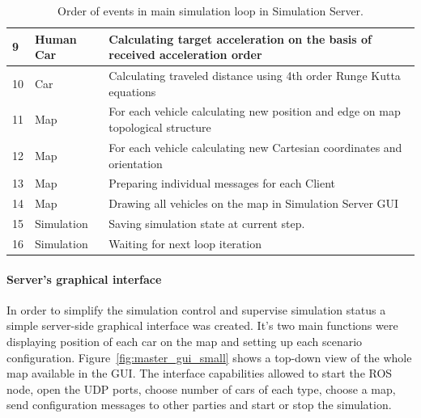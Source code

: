 \documentclass[11pt,english]{article}
\begin{document}
\begin{table}[]
\begin{tabular}{|l|p{2cm}|p{11cm}|}
9         & Human Car                    
& Calculating target acceleration on the basis of received acceleration order                            \\ \hline
10        & Car                                 & Calculating traveled distance using 4th order Runge Kutta equations                                    \\ \hline
11        & Map                                 & For each vehicle calculating new position and edge on map topological structure                     \\ \hline
12        & Map                                 & For each vehicle calculating new Cartesian coordinates and orientation                                 \\ \hline
13        & Map                                 & Preparing individual messages for each Client                                                          \\ \hline
14        & Map                                 & Drawing all vehicles on the map in Simulation Server GUI                                               \\ \hline
15        & Simulation                          & Saving simulation state at current step.                                                               \\ \hline
16        & Simulation                          & Waiting for next loop iteration                                                                        \\ \hline
\end{tabular}
\caption{Order of events in main simulation loop in Simulation Server.}
\label{table:order_server}
\end{table}


\paragraph{Server's graphical interface}


In order to simplify the simulation control and supervise simulation status a simple server-side graphical interface was created. It's two main functions were displaying position of each car on the map and setting up each scenario configuration. Figure~\ref{fig:master_gui_small} shows a top-down view of the whole map available in the GUI. The interface capabilities allowed to start the ROS node, open the UDP ports, choose number of cars of each type, choose a map, send configuration messages to other parties and start or stop the simulation. 
\end{document}
